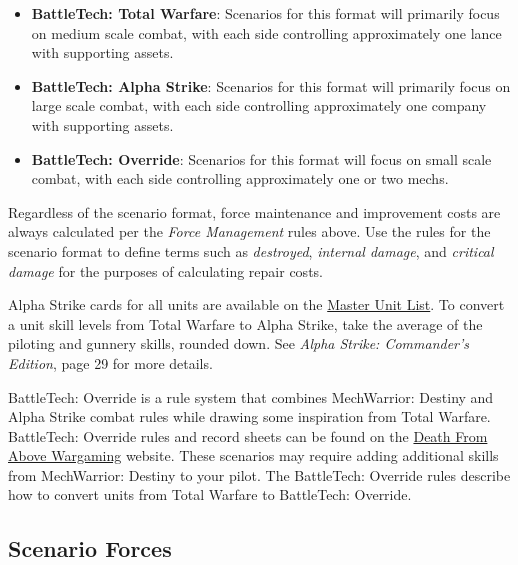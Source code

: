 \documentclass{article}
\begin{document}
\begin{itemize}

\item {\bfseries BattleTech: Total Warfare}: Scenarios for this format will primarily focus on medium scale combat, with each side controlling approximately one lance with supporting assets.

\item {\bfseries BattleTech: Alpha Strike}: Scenarios for this format will primarily focus on large scale combat, with each side controlling approximately one company with supporting assets.

\item {\bfseries BattleTech: Override}: Scenarios for this format will focus on small scale combat, with each side controlling approximately one or two mechs.

\end{itemize}

Regardless of the scenario format, force maintenance and improvement costs are always calculated per the \emph{Force Management} rules above.
Use the rules for the scenario format to define terms such as \emph{destroyed}, \emph{internal damage}, and \emph{critical damage} for the purposes of calculating repair costs.

Alpha Strike cards for all units are available on the \href{http://www.masterunitlist.info}{Master Unit List}.
To convert a unit skill levels from Total Warfare to Alpha Strike, take the average of the piloting and gunnery skills, rounded down.
See \emph{Alpha Strike: Commander's Edition}, page 29 for more details.

BattleTech: Override is a rule system that combines MechWarrior: Destiny and Alpha Strike combat rules while drawing some inspiration from Total Warfare.
BattleTech: Override rules and record sheets can be found on the \href{https://dfawargaming.com}{Death From Above Wargaming} website.
These scenarios may require adding additional skills from MechWarrior: Destiny to your pilot.
The BattleTech: Override rules describe how to convert units from Total Warfare to BattleTech: Override.

\subsection{Scenario Forces}
\end{document}
